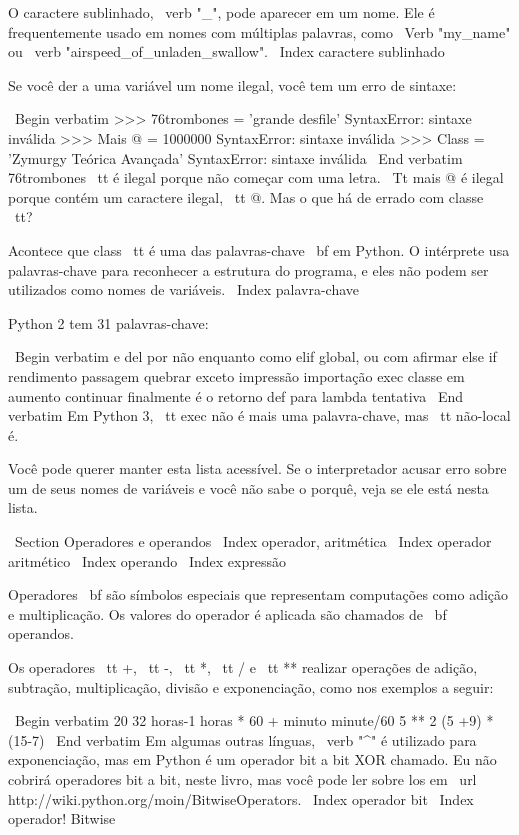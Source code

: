 \documentclass[10pt]{book}
\begin{document}
{O caractere sublinhado, \ verb "_", pode aparecer em um nome.
Ele é frequentemente usado em nomes com múltiplas palavras, como
\ Verb "my_name" ou \ verb "airspeed_of_unladen_swallow".
\ Index {caractere sublinhado}

Se você der a uma variável um nome ilegal, você tem um erro de sintaxe:

\ Begin {verbatim}
>>> 76trombones = 'grande desfile'
SyntaxError: sintaxe inválida
>>> Mais @ = 1000000
SyntaxError: sintaxe inválida
>>> Class = 'Zymurgy Teórica Avançada'
SyntaxError: sintaxe inválida
\ End {verbatim}
%
{76trombones \ tt} é ilegal porque não começar com uma letra.
{\ Tt mais @} é ilegal porque contém um caractere ilegal, {\ tt
@}. Mas o que há de errado com classe {\ tt}?

Acontece que {class \ tt} é uma das palavras-chave {\ bf} em Python. O
intérprete usa palavras-chave para reconhecer a estrutura do programa,
e eles não podem ser utilizados como nomes de variáveis.
\ Index {palavra-chave}

Python 2 tem 31 palavras-chave:

\ Begin {verbatim}
e del por não enquanto    
como elif global, ou com     
afirmar else if rendimento passagem    
quebrar exceto impressão importação              
exec classe em aumento              
continuar finalmente é o retorno             
def para lambda tentativa
\ End {verbatim}
%
Em Python 3, {\ tt exec} não é mais uma palavra-chave, mas {\ tt} não-local é.

Você pode querer manter esta lista acessível. Se o interpretador acusar erro
sobre um de seus nomes de variáveis ​​e você não sabe o porquê, veja se ele
está nesta lista.


\ Section {Operadores e operandos}
\ Index {operador, aritmética}
\ Index {operador aritmético}
\ Index {operando}
\ Index {expressão}

{Operadores \ bf} são símbolos especiais que representam computações como
adição e multiplicação. Os valores do operador é aplicada
são chamados de {\ bf operandos}.

Os operadores {\ tt +}, {\ tt -}, {\ tt *}, {\ tt /} e {\ tt **}
realizar operações de adição, subtração, multiplicação, divisão e
exponenciação, como nos exemplos a seguir:

\ Begin {verbatim}
20 32 horas-1 horas * 60 + minuto minute/60 5 ** 2 (5 +9) * (15-7)
\ End {verbatim}
%
Em algumas outras línguas, \ verb "^" é utilizado para exponenciação, mas
em Python é um operador bit a bit XOR chamado. Eu não cobrirá
operadores bit a bit, neste livro, mas você pode ler sobre
los em \ url {http://wiki.python.org/moin/BitwiseOperators}.
\ Index {operador bit}
\ Index {operador! Bitwise}

}
\end{document}
